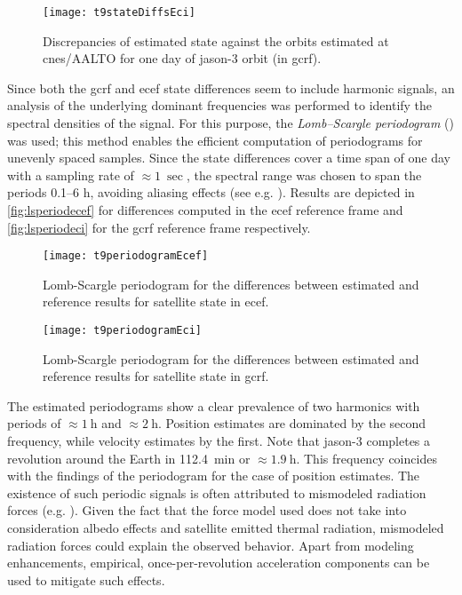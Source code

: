 \begin{figure}[ht]
    \centering
    \texttt{[image: t9stateDiffsEci]}
    \caption{Discrepancies of estimated state against the orbits estimated at \gls{cnes}/AALTO for one day of \gls{jason}-3 orbit (in \gls{gcrf}).}
    \label{fig:statediffseci}
\end{figure}

Since both the \gls{gcrf} and \gls{ecef} state differences seem to include 
harmonic signals, an analysis of the underlying dominant frequencies was performed to 
identify the spectral densities of the signal. For this purpose, the 
\emph{Lomb–Scargle periodogram} (\cite{Scargle1982}) was used; this method enables 
the efficient computation of periodograms for unevenly spaced samples. Since the 
state differences cover a time span of one day with a sampling rate of $\approx \SI{1}{\sec}$, 
the spectral range was chosen to span the periods \numrange{0.1}{6} \si{\hour}, 
avoiding aliasing effects (see e.g. \cite{VanderPlas2018}). Results are depicted in 
\autoref{fig:lsperiodecef} for differences computed in the \gls{ecef} reference frame 
and \autoref{fig:lsperiodeci} for the \gls{gcrf} reference frame respectively.

\begin{figure}[ht]
    \centering
    \texttt{[image: t9periodogramEcef]}
    \caption{Lomb-Scargle periodogram for the differences between estimated and reference results for satellite state in \gls{ecef}.}
    \label{fig:lsperiodecef}
\end{figure}

\begin{figure}[ht]
    \centering
    \texttt{[image: t9periodogramEci]}
    \caption{Lomb-Scargle periodogram for the differences between estimated and reference results for satellite state in \gls{gcrf}.}
    \label{fig:lsperiodeci}
\end{figure}

The estimated periodograms show a clear prevalence of two harmonics with periods of 
$\approx \SI{1}{\hour}$ and $\approx \SI{2}{\hour}$. Position estimates are dominated by 
the second frequency, while velocity estimates by the first. Note that \gls{jason}-3 
completes a revolution around the Earth in \SI{112.4}{\minute} or $\approx \SI{1.9}{\hour}$. 
This frequency coincides with the findings of the periodogram for the case of position 
estimates. The existence of such periodic signals is often attributed to 
mismodeled radiation forces (e.g. \cite{Xia2022}). Given the fact that the force model 
used does not take into consideration albedo effects and satellite emitted thermal radiation, 
mismodeled radiation forces could explain the observed behavior. Apart from modeling 
enhancements, empirical, once-per-revolution acceleration components can be used to 
mitigate such effects.

